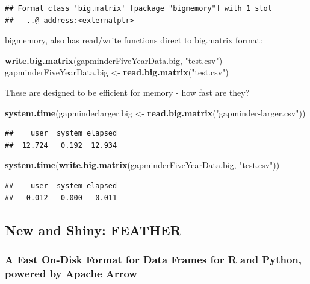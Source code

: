 \documentclass[]{article}
\newenvironment{Shaded}{\begin{snugshade}}{\end{snugshade}}
\newcommand{\KeywordTok}[1]{\textcolor[rgb]{0.13,0.29,0.53}{\textbf{{#1}}}}
\newcommand{\StringTok}[1]{\textcolor[rgb]{0.31,0.60,0.02}{{#1}}}
\newcommand{\NormalTok}[1]{{#1}}
\begin{document}
\begin{verbatim}
## Formal class 'big.matrix' [package "bigmemory"] with 1 slot
##   ..@ address:<externalptr>
\end{verbatim}

bigmemory, also has read/write functions direct to big.matrix format:

\begin{Shaded}
\begin{Highlighting}[]
\KeywordTok{write.big.matrix}\NormalTok{(gapminderFiveYearData.big, }\StringTok{"test.csv"}\NormalTok{)}
\NormalTok{gapminderFiveYearData.big <-}\StringTok{ }\KeywordTok{read.big.matrix}\NormalTok{(}\StringTok{"test.csv"}\NormalTok{)}
\end{Highlighting}
\end{Shaded}

These are designed to be efficient for memory - how fast are they?

\begin{Shaded}
\begin{Highlighting}[]
\KeywordTok{system.time}\NormalTok{(gapminderlarger.big <-}\StringTok{ }\KeywordTok{read.big.matrix}\NormalTok{(}\StringTok{"gapminder-larger.csv"}\NormalTok{))}
\end{Highlighting}
\end{Shaded}

\begin{verbatim}
##    user  system elapsed 
##  12.724   0.192  12.934
\end{verbatim}

\begin{Shaded}
\begin{Highlighting}[]
\KeywordTok{system.time}\NormalTok{(}\KeywordTok{write.big.matrix}\NormalTok{(gapminderFiveYearData.big, }\StringTok{"test.csv"}\NormalTok{))}
\end{Highlighting}
\end{Shaded}

\begin{verbatim}
##    user  system elapsed 
##   0.012   0.000   0.011
\end{verbatim}

\subsection{New and Shiny: FEATHER}\label{new-and-shiny-feather}

\subsubsection{A Fast On-Disk Format for Data Frames for R and Python,
powered by Apache
Arrow}\label{a-fast-on-disk-format-for-data-frames-for-r-and-python-powered-by-apache-arrow}
\end{document}
